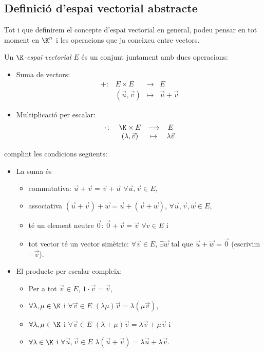\subsection{Definició d'espai vectorial abstracte}
Tot i que definirem el concepte d'espai vectorial en general, podeu pensar en tot moment en $\K^n$ i les operacions que ja coneixeu entre vectors.
\begin{definicio}
	Un \emph{$\K$-espai vectorial $E$} és un conjunt juntament amb dues operacions:
	\begin{itemize}
		\item Suma de vectors:
		$$
		\begin{array}{cccc}
		+ \colon & E \times E & \longrightarrow & E \\
		&(\vec u,\vec v) & \mapsto & \vec u+\vec v
		\end{array}
		$$
		\item Multiplicació per escalar:
		$$
		\begin{array}{cccc}
		\cdot \colon & \K \times E & \longrightarrow & E \\
		&(\lambda,\vec v) & \mapsto & \lambda \vec v
		\end{array}
		$$
	\end{itemize}
	complint les condicions següents:
	\begin{itemize}
		\item La suma és 
		\begin{itemize}
			\item commutativa: $\vec u+\vec v=\vec v+\vec u$ $\forall \vec u,\vec v \in E$, 
			\item associativa $(\vec u+\vec v)+\vec w=\vec u+(\vec v+\vec w)$, $\forall \vec u,\vec v,\vec w \in E$,
			\item té un element neutre $\vec 0$: $\vec 0+\vec v=\vec v$ $\forall v \in E$ i
			\item tot vector té un vector simètric: $\forall \vec v\in E$, $\exists \vec w$ tal que $\vec u + \vec w=\vec 0$ (escrivim $-\vec v$).
		\end{itemize}
		\item El producte per escalar compleix:
		\begin{itemize}
			\item Per a tot $\vec v \in E$, $1 \cdot \vec v=\vec v$,
			\item $\forall \lambda, \mu \in \K$ i $\forall \vec v \in E$ $(\lambda \mu)\vec v=\lambda(\mu \vec v)$,
			\item $\forall \lambda, \mu \in \K$ i $\forall \vec v \in E$ $(\lambda + \mu)\vec v=\lambda \vec v + \mu \vec v$ i
			\item $\forall \lambda \in \K$ i $\forall \vec u, \vec v \in E$ $\lambda(\vec u +\vec v)=\lambda\vec u + \lambda \vec v$.
		\end{itemize}
	\end{itemize}
\end{definicio}
